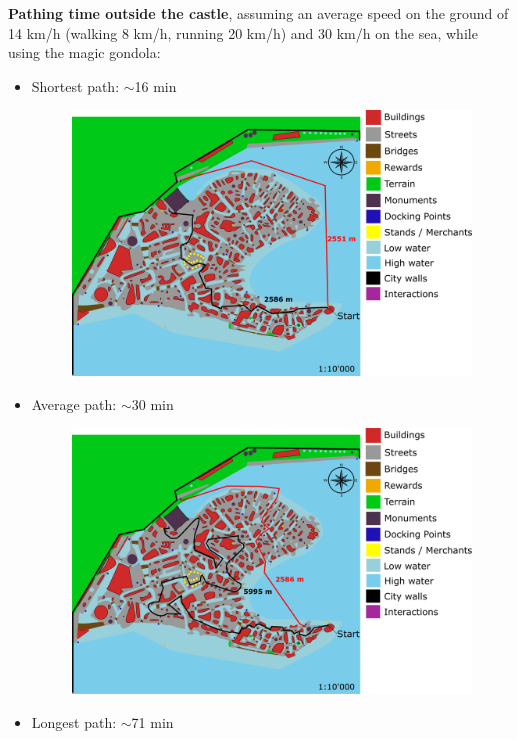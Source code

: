 \textbf{Pathing time outside the castle}, assuming an average speed on the ground of 14 km/h (walking 8 km/h, running 20 km/h) and 30 km/h on the sea, while using the magic gondola:
\begin{itemize}
\item Shortest path: $\sim$16 min \\
\begin{figure}[H]
    \centering
\includegraphics[scale=0.3]{Images/Diagrams/dynamiapath1.png}
\end{figure}
\item Average path: $\sim$30 min \\
\begin{figure}[H]
    \centering
\includegraphics[scale=0.226]{Images/Diagrams/dynamiapath2.png}
\end{figure}
\item Longest path: $\sim$71 min \\

\end{itemize}

